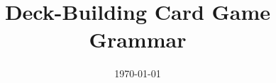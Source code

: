 \documentclass{article}
\title{Deck-Building Card Game Grammar}
\date{\today} %
\begin{document}
\maketitle
\thispagestyle{empty}

\begin{grammar}

\end{grammar}
\end{document}
